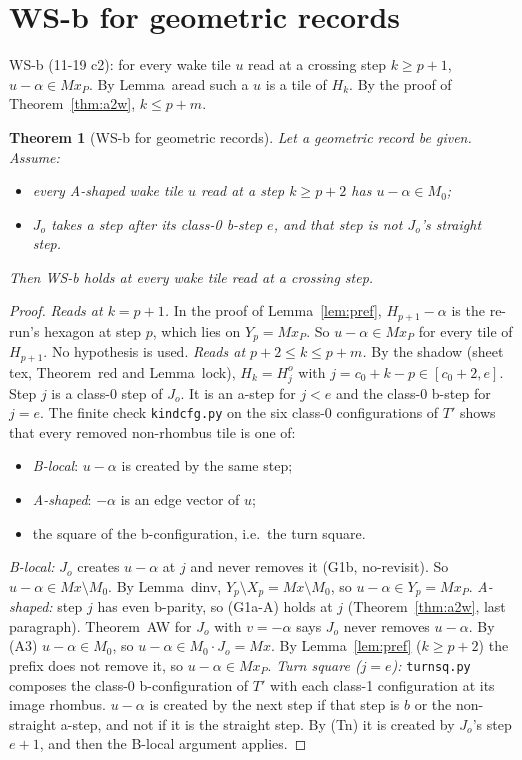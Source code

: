 \documentclass[11pt]{article}
\newtheorem{theorem}{Theorem}\newtheorem{lemma}[theorem]{Lemma}\newtheorem{proposition}[theorem]{Proposition}
\theoremstyle{definition}\newtheorem{definition}[theorem]{Definition}\newtheorem{remark}[theorem]{Remark}
\begin{document}
\section{WS-b for geometric records}\label{sec:wsb}
WS-b (11-19 c2): for every wake tile $u$ read at a crossing step $k\ge p+1$, $u-\alpha\in Mx_P$. By Lemma~aread such a $u$ is a tile of $H_k$. By the proof of Theorem~\ref{thm:a2w}, $k\le p+m$.
\begin{theorem}[WS-b for geometric records]\label{thm:wsb}
Let a geometric record be given. Assume:
\begin{itemize}
\item[\textbf{(A3)}] every A-shaped wake tile $u$ read at a step $k\ge p+2$ has $u-\alpha\in M_0$;
\item[\textbf{(Tn)}] $J_o$ takes a step after its class-0 b-step $e$, and that step is not $J_o$'s straight step.
\end{itemize}
Then WS-b holds at every wake tile read at a crossing step.
\end{theorem}
\begin{proof}
\emph{Reads at $k=p+1$.} In the proof of Lemma~\ref{lem:pref}, $H_{p+1}-\alpha$ is the re-run's hexagon at step $p$, which lies on $Y_p=Mx_P$. So $u-\alpha\in Mx_P$ for every tile of $H_{p+1}$. No hypothesis is used.
\emph{Reads at $p+2\le k\le p+m$.} By the shadow (sheet tex, Theorem~red and Lemma~lock), $H_k=H^o_j$ with $j=c_0+k-p\in[c_0+2,e]$. Step $j$ is a class-0 step of $J_o$. It is an a-step for $j<e$ and the class-0 b-step for $j=e$. The finite check \texttt{kindcfg.py} on the six class-0 configurations of $T'$ shows that every removed non-rhombus tile is one of:
\begin{itemize}
\item \emph{B-local}: $u-\alpha$ is created by the same step;
\item \emph{A-shaped}: $-\alpha$ is an edge vector of $u$;
\item the square of the b-configuration, i.e.\ the turn square.
\end{itemize}
\emph{B-local:} $J_o$ creates $u-\alpha$ at $j$ and never removes it (G1b, no-revisit). So $u-\alpha\in Mx\setminus M_0$. By Lemma~dinv, $Y_p\setminus X_p=Mx\setminus M_0$, so $u-\alpha\in Y_p=Mx_P$.
\emph{A-shaped:} step $j$ has even b-parity, so (G1a-A) holds at $j$ (Theorem~\ref{thm:a2w}, last paragraph). Theorem~AW for $J_o$ with $v=-\alpha$ says $J_o$ never removes $u-\alpha$. By (A3) $u-\alpha\in M_0$, so $u-\alpha\in M_0\cdot J_o=Mx$. By Lemma~\ref{lem:pref} ($k\ge p+2$) the prefix does not remove it, so $u-\alpha\in Mx_P$.
\emph{Turn square ($j=e$):} \texttt{turnsq.py} composes the class-0 b-configuration of $T'$ with each class-1 configuration at its image rhombus. $u-\alpha$ is created by the next step if that step is $b$ or the non-straight a-step, and not if it is the straight step. By (Tn) it is created by $J_o$'s step $e+1$, and then the B-local argument applies.
\end{proof}
\end{document}
